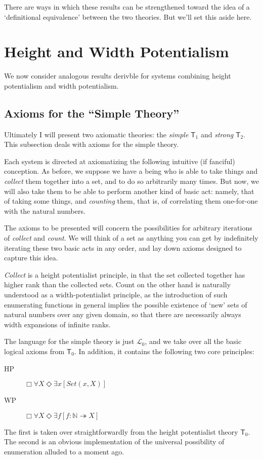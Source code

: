 \documentclass{article}
\begin{document}
There are ways in which these results can be strengthened toward the idea of a 
`definitional equivalence' between the two theories. But we'll set this aside here.



\section{Height and Width Potentialism}
We now consider analogous results derivble for systems combining height potentialism 
and width potentialism.

\subsection{Axioms for the ``Simple Theory''}
Ultimately I will present two axiomatic theories: 
the \emph{simple} $\mathsf{T}_1$ and \emph{strong} $\mathsf{T}_2$.
This subsection deals with axioms for the simple theory.

Each system is directed at axiomatizing the following intuitive (if fanciful) conception.
As before, we suppose we have a being who is able to take things and \emph{collect} 
them together into a set, and to do so arbitrarily many times.
But now, we will also take them to be able to perform another kind of basic act: namely, 
that of taking some things, and \emph{counting} them, that is, 
of correlating them one-for-one
with the natural numbers. 

The axioms to be presented
will concern the possibilities for arbitrary iterations 
of \emph{collect} and \emph{count}. We will think of a set as anything 
you can get by indefinitely iterating these two basic acts in any order,
and lay down axioms designed to capture this idea.

\emph{Collect} is a height potentialist 
principle, in that the set collected together has higher rank than the collected sets.
Count on the other hand is naturally understood as a width-potentialist principle, 
as the introduction of such enumerating functions in general implies the possible 
existence of `new' sets of natural numbers over any given domain, so that there are necessarily 
always width expansions of infinite ranks. 



The language for the simple theory is just $\mathcal{L}_0$, and we
take over all the basic logical axioms from $\mathsf{T}_0$.
In addition, it contains the following two core principles:
\begin{description} 
    \item[HP] $\Box \forall X \Diamond \exists x [Set(x, X)]$
    \item[WP] $\Box \forall X \Diamond \exists f[f : \mathbb{N} \twoheadrightarrow X]$
\end{description}
The first is taken over straightforwardly from the height potentialist theory $\mathsf{T}_0$.
The second is an obvious implementation of the universal possibility of enumeration 
alluded to a moment ago. 
\end{document}
